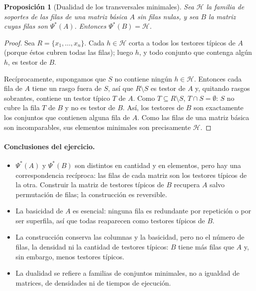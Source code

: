 \documentclass[11pt, a4paper]{article}
\theoremstyle{definition}
\theoremstyle{plain}
\newtheorem{proposicion}{Proposición}
\newcommand{\Psis}{\Psi^{*}}
\newcommand{\x}[1]{x_{#1}}
\begin{document}
\begin{proposicion}[Dualidad de los transversales minimales]\label{prop:dualidad}
Sea $\mathcal H$ la familia de soportes de las filas de una matriz básica $A$
sin filas nulas, y sea $B$ la matriz cuyas filas son $\Psis(A)$. Entonces
$\Psis(B)=\mathcal H$.
\end{proposicion}
\begin{proof}
Sea $R=\{\x1,\dots,\x n\}$. Cada $h\in\mathcal H$ corta a todos los testores
típicos de $A$ (porque éstos cubren todas las filas); luego $h$, y todo conjunto
que contenga algún $h$, es testor de $B$.

Recíprocamente, supongamos que $S$ no contiene ningún $h\in\mathcal H$. Entonces
cada fila de $A$ tiene un rasgo fuera de $S$, así que $R\setminus S$ es testor de
$A$ y, quitando rasgos sobrantes, contiene un testor típico $T$ de $A$. Como
$T\subseteq R\setminus S$, $T\cap S=\emptyset$: $S$ no cubre la fila $T$ de $B$ y
no es testor de $B$. Así, los testores de $B$ son exactamente los conjuntos que
contienen alguna fila de $A$. Como las filas de una matriz básica son
incomparables, sus elementos minimales son precisamente $\mathcal H$.
\end{proof}

\paragraph{Conclusiones del ejercicio.}
\begin{itemize}[nosep]
\item $\Psis(A)$ y $\Psis(B)$ son distintos en cantidad y en elementos, pero hay
  una correspondencia recíproca: las filas de cada matriz son los testores
  típicos de la otra. Construir la matriz de testores típicos de $B$ recupera $A$
  salvo permutación de filas; la construcción es reversible.
\item La basicidad de $A$ es esencial: ninguna fila es redundante por repetición
  o por ser superfila, así que todas reaparecen como testores típicos de $B$.
\item La construcción conserva las columnas y la basicidad, pero no el número de
  filas, la densidad ni la cantidad de testores típicos: $B$ tiene más filas que
  $A$ y, sin embargo, menos testores típicos.
\item La dualidad se refiere a familias de conjuntos minimales, no a igualdad de
  matrices, de densidades ni de tiempos de ejecución.
\end{itemize}
\end{document}
